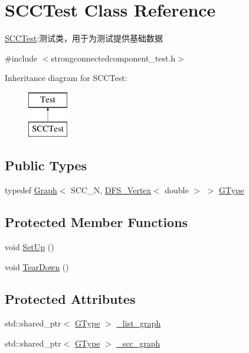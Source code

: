 \hypertarget{class_s_c_c_test}{}\section{S\+C\+C\+Test Class Reference}
\label{class_s_c_c_test}


\hyperlink{class_s_c_c_test}{S\+C\+C\+Test}\+:测试类，用于为测试提供基础数据  




{\ttfamily \#include $<$strongconnectedcomponent\+\_\+test.\+h$>$}

Inheritance diagram for S\+C\+C\+Test\+:\begin{figure}[H]
\begin{center}
\leavevmode
\includegraphics[height=2.000000cm]{class_s_c_c_test}
\end{center}
\end{figure}
\subsection*{Public Types}
\begin{DoxyCompactItemize}
\item 
typedef \hyperlink{struct_introduction_to_algorithm_1_1_graph_algorithm_1_1_graph}{Graph}$<$ S\+C\+C\+\_\+\+N, \hyperlink{struct_introduction_to_algorithm_1_1_graph_algorithm_1_1_d_f_s___vertex}{D\+F\+S\+\_\+\+Vertex}$<$ double $>$ $>$ \hyperlink{class_s_c_c_test_abb59a4d30b8d2bb5c08e09e902745824}{G\+Type}
\end{DoxyCompactItemize}
\subsection*{Protected Member Functions}
\begin{DoxyCompactItemize}
\item 
void \hyperlink{class_s_c_c_test_a840b86482e67f9b7e483645eea64d950}{Set\+Up} ()
\item 
void \hyperlink{class_s_c_c_test_a9de4301f4841fd61853a61399f6f9bfc}{Tear\+Down} ()
\end{DoxyCompactItemize}
\subsection*{Protected Attributes}
\begin{DoxyCompactItemize}
\item 
std\+::shared\+\_\+ptr$<$ \hyperlink{class_s_c_c_test_abb59a4d30b8d2bb5c08e09e902745824}{G\+Type} $>$ \hyperlink{class_s_c_c_test_a45ded9e0483b0f9c25bbbe8b058c8b77}{\+\_\+list\+\_\+graph}
\item 
std\+::shared\+\_\+ptr$<$ \hyperlink{class_s_c_c_test_abb59a4d30b8d2bb5c08e09e902745824}{G\+Type} $>$ \hyperlink{class_s_c_c_test_a4752a3091b185c9f5e5beddb842211e5}{\+\_\+scc\+\_\+graph}
\end{DoxyCompactItemize}


